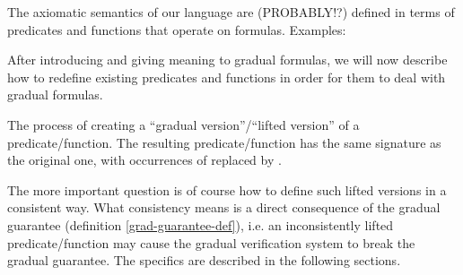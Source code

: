 
The axiomatic semantics of our language are (PROBABLY!?) defined in terms of predicates and functions that operate on formulas.
Examples:

After introducing and giving meaning to gradual formulas, we will now describe how to redefine existing predicates and functions in order for them to deal with gradual formulas.

\begin{definition}
    The process of creating a “gradual version”/“lifted version” of a predicate/function.
    The resulting predicate/function has the same signature as the original one, with occurrences of \setFormula replaced by \setGFormula.
\end{definition}

The more important question is of course how to define such lifted versions in a consistent way.
What consistency means is a direct consequence of the gradual guarantee (definition \ref{grad-guarantee-def}), i.e. an inconsistently lifted predicate/function may cause the gradual verification system to break the gradual guarantee.
The specifics are described in the following sections.